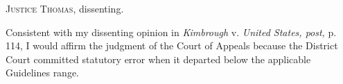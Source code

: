 
\setcounter{page}{61}

  \textsc{Justice Thomas,} dissenting.

  Consistent with my dissenting opinion in \emph{Kimbrough} v. \emph{United
States, post,} p. 114, I would affirm the judgment of the Court of
Appeals because the District Court committed statutory error when it
departed below the applicable Guidelines range.

